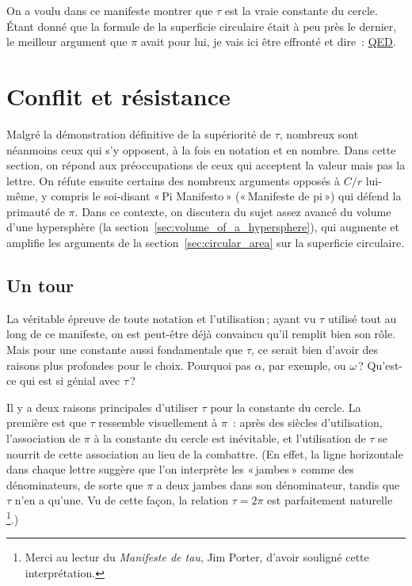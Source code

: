 On a voulu dans ce manifeste montrer que $\tau$ est la vraie constante du cercle. Étant donné que la formule de la superficie circulaire était à peu près le dernier, le meilleur argument que $\pi$ avait pour lui, je vais ici être effronté et dire~: \href{https://fr.wikipedia.org/wiki/CQFD_(math%C3%A9matiques)}{QED}.



\section{Conflit et résistance} %
\label{sec:conflict_and_resistance}

Malgré la démonstration définitive de la supériorité de $\tau$, nombreux sont néanmoins ceux qui s'y opposent, à la fois en notation et en nombre. Dans cette section, on répond aux préoccupations de ceux qui acceptent la valeur mais pas la lettre. On réfute ensuite certains des nombreux arguments opposés à $C/r$ lui-même, y compris le soi-disant «\,Pi Manifesto\,» («\,Manifeste de pi\,») qui défend la primauté de $\pi$. Dans ce contexte, on discutera du sujet assez avancé du volume d'une hypersphère (la section~\ref{sec:volume_of_a_hypersphere}), qui augmente et amplifie les arguments de la section~\ref{sec:circular_area} sur la superficie circulaire.

  \subsection{Un tour} %
  \label{sec:one_turn}

La véritable épreuve de toute notation et l'utilisation\,; ayant vu $\tau$ utilisé tout au long de ce manifeste, on est peut-être déjà convaincu qu'il remplit bien son rôle. Mais pour une constante aussi fondamentale que $\tau$, ce serait bien d'avoir des raisons plus profondes pour le choix. Pourquoi pas $\alpha$, par exemple, ou $\omega$\,? Qu'est-ce qui est si génial avec $\tau$\,?

Il y a deux raisons principales d'utiliser $\tau$ pour la constante du cercle. La première est que $\tau$ ressemble visuellement à $\pi$~: après des siècles d'utilisation, l'association de $\pi$ à la constante du cercle est inévitable, et l'utilisation de $\tau$ se nourrit de cette association au lieu de la combattre. (En effet, la ligne horizontale dans chaque lettre suggère que l'on interprète les «\,jambes\,» comme des dénominateurs, de sorte que $\pi$ a deux jambes dans son dénominateur, tandis que $\tau$ n'en a qu'une. Vu de cette façon, la relation $\tau = 2\pi$ est parfaitement naturelle\,\footnote{Merci au lectur du \emph{Manifeste de tau}, Jim Porter, d'avoir souligné cette interprétation.}.)

